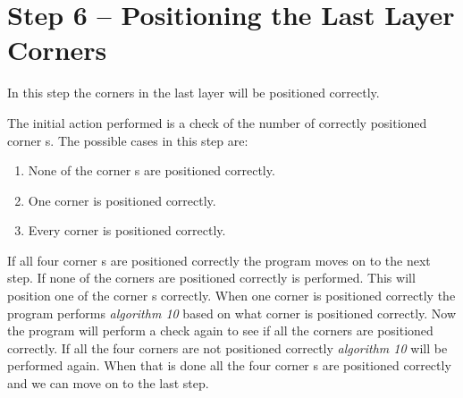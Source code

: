 \section{Step 6 -- Positioning the Last Layer Corners}
In this step the corners in the last layer will be positioned correctly.

The initial action performed is a check of the number of correctly positioned corner \cpiece{}s.
The possible cases in this step are:
\begin{enumerate}
	\item None of the corner \cubie{}s are positioned correctly.
	\item One corner \cubie{} is positioned correctly.
	\item Every corner \cubie{} is positioned correctly.
\end{enumerate}

If all four corner \cpiece{}s are positioned correctly the program moves on to the next step.
If none of the corners are positioned correctly  is performed. This will position one of the corner \cpiece{}s correctly.
When one corner is positioned correctly the program performs \textit{algorithm 10} based on what corner is positioned correctly.
Now the program will perform a check again to see if all the corners are positioned correctly. If all the four corners are not positioned correctly \textit{algorithm 10} will be performed again.
When that is done all the four corner \cpiece{}s are positioned correctly and we can move on to the last step.